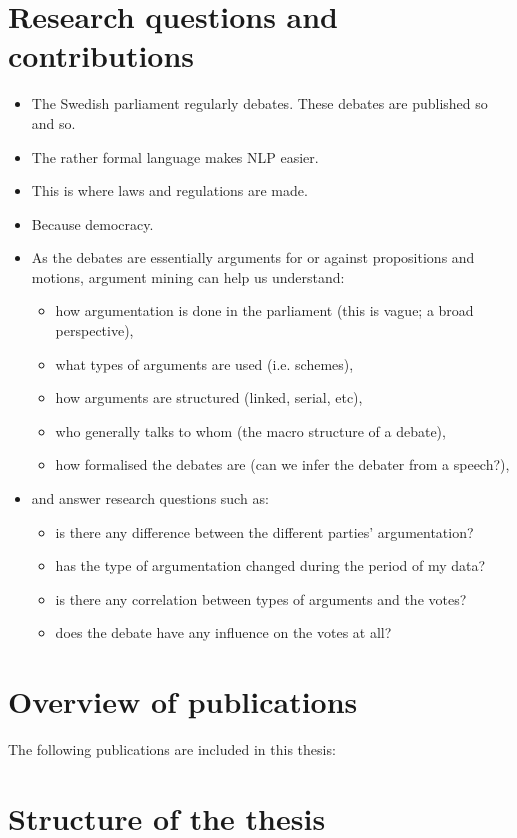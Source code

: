 \section{Research questions and contributions}
\label{sec:contrib}

\begin{itemize}
    \item The Swedish parliament regularly debates. These debates are published so and so.
    \item The rather formal language makes NLP easier.
    \item This is where laws and regulations are made.
    \item Because democracy.
    \item As the debates are essentially arguments for or against propositions and motions, argument mining can help us understand:
    \begin{itemize}
        \item how argumentation is done in the parliament (this is vague; a broad perspective),
        \item what types of arguments are used (i.e. schemes),
        \item how arguments are structured (linked, serial, etc),
        \item who generally talks to whom (the macro structure of a debate),
        \item how formalised the debates are (can we infer the debater from a speech?),
    \end{itemize}
    \item and answer research questions such as:
    \begin{itemize}
        \item is there any difference between the different parties' argumentation?
        \item has the type of argumentation changed during the period of my data?
        \item is there any correlation between types of arguments and the votes?
        \item does the debate have any influence on the votes at all?
    \end{itemize}
\end{itemize}

\section{Overview of publications}

The following publications are included in this thesis:

\section{Structure of the thesis}
\label{sec:thesis_struct}
